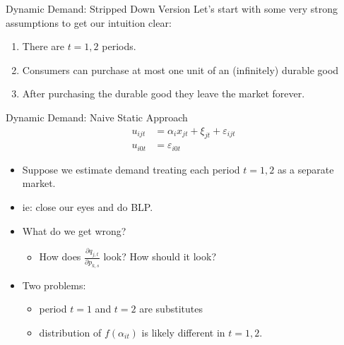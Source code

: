 \begin{frame}{Dynamic Demand: Stripped Down Version}
Let's start with some very strong assumptions to get our intuition clear:
\begin{enumerate}
\item There are $t=1,2$ periods.
\item Consumers can purchase at most one unit of an (infinitely) durable good
\item After purchasing the durable good they leave the market forever.
\end{enumerate}
\end{frame}

\begin{frame}{Dynamic Demand: Naive Static Approach}
\begin{align*}
u_{ijt} &=   \alpha_i x_{jt}  +  \xi_{jt} + \varepsilon_{ijt}\\
u_{i0t} &=  \varepsilon_{i0t} 
\end{align*}
\begin{itemize}
\item Suppose  we estimate demand treating each period $t=1,2$ as a \alert{separate market}.
\item ie: close our eyes and do BLP.
\item What do we get wrong? \pause
\begin{itemize}
\item How does $\frac{\partial q_{j,t}}{\partial p_{k,s}}$ look? How should it look?
\end{itemize}
\item Two problems: 
\begin{itemize}
\item period $t=1$ and $t=2$ are \alert{substitutes}
\item distribution of $f(\alpha_{it})$ is likely different in $t=1,2$.
\end{itemize}
\end{itemize}
\end{frame}


